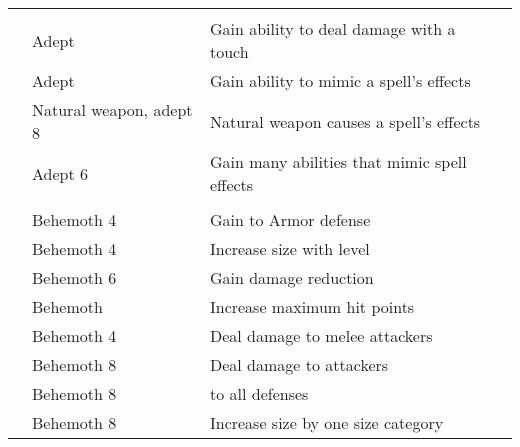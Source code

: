 \begin{longtabuwrapper}
\begin{longtabu}{>{\lcol}p{10em} >{\lcol}p{15em} >{\lcol}X >{\lcol}p{3em}}
            \midrule
            \label{Adept Traits} &  &  &  \\
             & Adept & Gain ability to deal damage with a touch &  \\
             & Adept & Gain ability to mimic a spell's effects &  \\
             & Natural weapon, adept 8 & Natural weapon causes a spell's effects &  \\
             & Adept 6 & Gain many abilities that mimic spell effects &  \\

            \midrule
            \label{Behemoth Traits} &  &  &  \\
             & Behemoth 4 & Gain  to Armor defense &  \\
             & Behemoth 4 & Increase size with level &  \\
             & Behemoth 6 & Gain damage reduction &  \\
             & Behemoth & Increase maximum hit points &  \\
             & Behemoth 4 & Deal damage to melee attackers &  \\
             & Behemoth 8 & Deal damage to attackers &  \\
             & Behemoth 8 &  to all defenses &  \\
             & Behemoth 8 & Increase size by one size category &  \\


\end{longtabu}
\end{longtabuwrapper}
